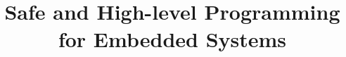 \documentclass{sig-alternate}
\newcommand{\2}{\;\;}
\newcommand{\5}{\;\;\;\;\;}
\newcommand{\CEU}{\textsc{C\'{e}u}}
\begin{document}

\title{Safe and High-level Programming for Embedded Systems}

\end{document}
